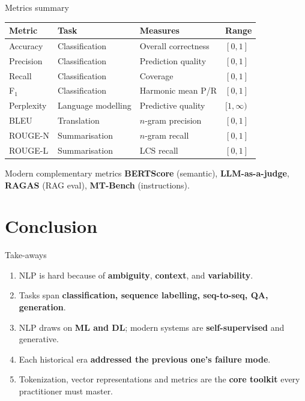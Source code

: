 \documentclass[11pt,aspectratio=169]{beamer}
\begin{document}
\begin{frame}{Metrics summary}
\begin{center}
\small
\begin{tabular}{|l|l|l|l|}
\hline
\textbf{Metric} & \textbf{Task} & \textbf{Measures} & \textbf{Range} \\
\hline
Accuracy & Classification & Overall correctness & $[0, 1]$ \\
Precision & Classification & Prediction quality & $[0, 1]$ \\
Recall & Classification & Coverage & $[0, 1]$ \\
F$_1$ & Classification & Harmonic mean P/R & $[0, 1]$ \\
Perplexity & Language modelling & Predictive quality & $[1, \infty)$ \\
BLEU & Translation & $n$-gram precision & $[0, 1]$ \\
ROUGE-N & Summarisation & $n$-gram recall & $[0, 1]$ \\
ROUGE-L & Summarisation & LCS recall & $[0, 1]$ \\
\hline
\end{tabular}
\end{center}
\vfill
\begin{block}{Modern complementary metrics}
\textbf{BERTScore} (semantic), \textbf{LLM-as-a-judge}, \textbf{RAGAS} (RAG eval), \textbf{MT-Bench} (instructions).
\end{block}
\end{frame}

\section*{Conclusion}

\begin{frame}{Take-aways}
\begin{enumerate}
    \item NLP is hard because of \textbf{ambiguity}, \textbf{context}, and \textbf{variability}.
    \item Tasks span \textbf{classification, sequence labelling, seq-to-seq, QA, generation}.
    \item NLP draws on \textbf{ML and DL}; modern systems are \textbf{self-supervised} and generative.
    \item Each historical era \textbf{addressed the previous one's failure mode}.
    \item Tokenization, vector representations and metrics are the \textbf{core toolkit} every practitioner must master.
\end{enumerate}
\end{frame}
\end{document}
